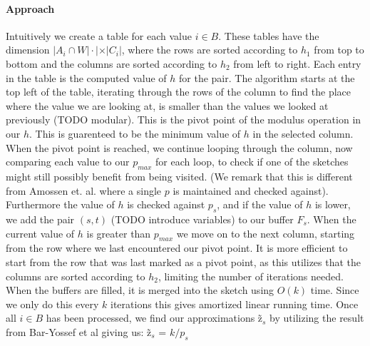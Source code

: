 \documentclass[a4paper,11pt]{article}
\begin{document}
\paragraph{Approach}
Intuitively we create a table for each value $i \in B$. These tables have the dimension $|A_i\cap W|\cdot | \times |C_i|$, where the rows are sorted according to $h_1$ from top to bottom and the columns are sorted according to $h_2$ from left to right. Each entry in the table is the computed value of $h$ for the pair. The algorithm starts at the top left of the table, iterating through the rows of the column to find the place where the value we are looking at, is smaller than the values we looked at previously (TODO modular). This is the pivot point of the modulus operation in our $h$. This is guarenteed to be the minimum value of $h$ in the selected column. When the pivot point is reached, we continue looping through the column, now comparing each value to our $p_{max}$ for each loop, to check if one of the sketches might still possibly benefit from being visited. (We remark that this is different from Amossen et. al. where a single $p$ is maintained and checked against). Furthermore the value of $h$ is checked against $p_s$, and if the value of $h$ is lower, we add the pair $(s,t)$ (TODO introduce variables) to our buffer $F_s$. When the current value of $h$ is greater than $p_{max}$ we move on to the next column, starting from the row where we last encountered our pivot point. It is more efficient to start from the row that was last marked as a pivot point, as this utilizes that the columns are sorted according to $h_2$, limiting the number of iterations needed. When the buffers are filled, it is merged into the sketch using $O(k)$ time. Since we only do this every $k$ iterations this gives amortized linear running time. Once all $i \in B$ has been processed, we find our approximations \~{z}$_s$ by utilizing the result from Bar-Yossef et al giving us: \~{z}$_s$ = $k/p_s$



\end{document}
